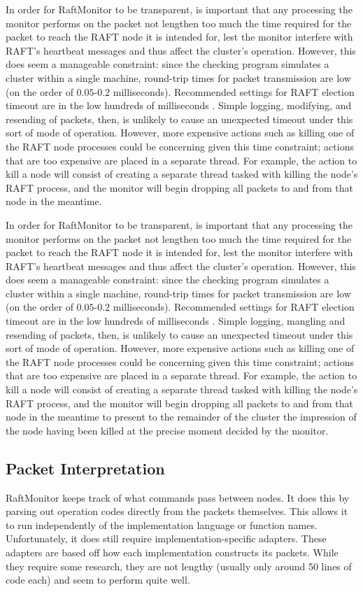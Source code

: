 \documentclass[UTF8]{article}
\begin{document}
In order for RaftMonitor to be transparent, is important that any processing the monitor performs on the packet not lengthen too much the time required for the packet to reach the RAFT node it is intended for, lest the monitor interfere with RAFT's heartbeat messages and thus affect the cluster's operation. However, this does seem a manageable constraint: since the checking program simulates a cluster within a single machine, round-trip times for packet transmission are low (on the order of $0.05$-$0.2$ milliseconds). Recommended settings for RAFT election timeout are in the low hundreds of milliseconds \cite{raftPaper}. Simple logging, modifying, and resending of packets, then, is unlikely to cause an unexpected timeout under this sort of mode of operation. However, more expensive actions such as killing one of the RAFT node processes could be concerning given this time constraint; actions that are too expensive are placed in a separate thread. For example, the action to kill a node will consist of creating a separate thread tasked with killing the node's RAFT process, and the monitor will begin dropping all packets to and from that node in the meantime.


In order for RaftMonitor to be transparent, is important that any processing the monitor performs on the packet not lengthen too much the time required for the packet to reach the RAFT node it is intended for, lest the monitor interfere with RAFT's heartbeat messages and thus affect the cluster's operation. However, this does seem a manageable constraint: since the checking program simulates a cluster within a single machine, round-trip times for packet transmission are low (on the order of $0.05$-$0.2$ milliseconds). Recommended settings for RAFT election timeout are in the low hundreds of milliseconds \cite{raftPaper}. Simple logging, mangling and resending of packets, then, is unlikely to cause an unexpected timeout under this sort of mode of operation. However, more expensive actions such as killing one of the RAFT node processes could be concerning given this time constraint; actions that are too expensive are placed in a separate thread. For example, the action to kill a node will consist of creating a separate thread tasked with killing the node's RAFT process, and the monitor will begin dropping all packets to and from that node in the meantime to present to the remainder of the cluster the impression of the node having been killed at the precise moment decided by the monitor.

\subsection{Packet Interpretation}
RaftMonitor keeps track of what commands pass between nodes. It does this by parsing out operation codes directly from the packets themselves. This allows it to run independently of the implementation language or function names. Unfortunately, it does still require implementation-specific adapters. These adapters are based off how each implementation constructs its packets. While they require some research, they are not lengthy (usually only around 50 lines of code each) and seem to perform quite well.
\end{document}

